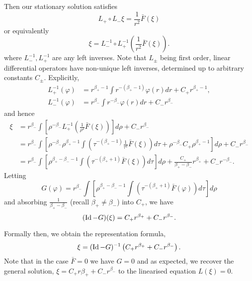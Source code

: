 \documentclass{amsart}
\begin{document}
Then our stationary solution satisfies
\[
L_+ \circ L_- \xi = \frac{1}{r^2} \bar{F}(\xi)
\]
or equivalently
\[
\xi = L_-^{-1} \circ L_+^{-1} \left(\frac{1}{r^2} \bar{F}(\xi)\right).
\]
where \(L_-^{-1}, L_+^{-1}\) are any left inverses. Note that \(L_{\pm}\) being first order, linear differential operators have non-unique left inverses, determined up to arbitrary constants \(C_{\pm}\). Explicitly,
\begin{align*}
L_+^{-1} (\varphi) &= r^{\beta_+ - 1} \int r^{-(\beta_+ - 1)} \varphi(r) dr + C_+ r^{\beta_+-1}, \\
L_-^{-1} (\varphi) &= r^{\beta_-} \int r^{-\beta_-} \varphi(r) dr + C_- r^{\beta_-}
\end{align*}
and hence
\begin{equation}
\label{eq:}
\begin{split}
\xi &= r^{\beta_-} \int \left[\rho^{-\beta_-} L_+^{-1} \left(\frac{1}{\rho^2} \bar{F}(\xi)\right)\right] d\rho + C_- r^{\beta_-} \\
&= r^{\beta_-} \int \left[\rho^{-\beta_-} \rho^{\beta_+ - 1} \int \left(\tau^{-(\beta_+ - 1)} \frac{1}{\tau^2} \bar{F}(\xi) \right)d\tau + \rho^{-\beta_-} C_+ \rho^{\beta_+-1}\right] d\rho + C_- r^{\beta_-} \\
&= r^{\beta_-} \int \left[\rho^{\beta_+ - \beta_- - 1} \int \left(\tau^{-(\beta_+ + 1)} \bar{F}(\xi) \right)d\tau\right] d\rho + \frac{C_+}{\beta_+ - \beta_-} r^{\beta_+} + C_- r^{-\beta_-}.
\end{split}
\end{equation}
Letting
\[
G(\varphi) = r^{\beta_-} \int \left[\rho^{\beta_+ - \beta_- - 1} \int \left(\tau^{-(\beta_+ + 1)} \bar{F}(\varphi) \right)d\tau\right] d\rho
\]
and absorbing \(\tfrac{1}{\beta_+ - \beta_-}\) (recall \(\beta_+ \ne \beta_-\)) into \(C_+\), we have
\[
(\operatorname{Id} - G) (\xi) = C_+ r^{\beta_+} + C_- r^{\beta_-}.
\]

Formally then, we obtain the representation formula,
\[
\xi = (\operatorname{Id} - G)^{-1} \left(C_+ r^{\beta_+} + C_- r^{\beta_-}\right).
\]
Note that in the case \(\bar{F} = 0\) we have \(G = 0\) and as expected, we recover the general solution, \(\xi = C_+ r{\beta_+} + C_- r^{\beta_-}\) to the linearised equation \(L(\xi) = 0\).
\end{document}
